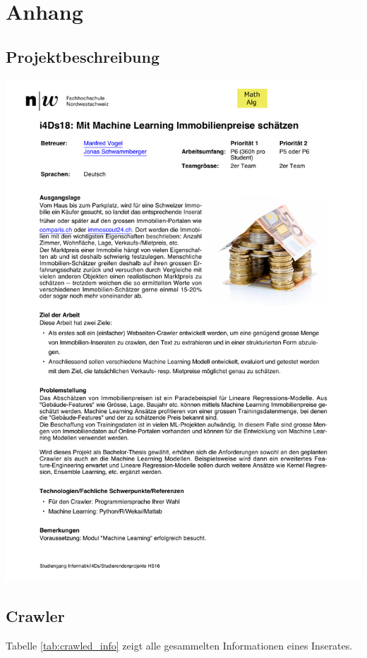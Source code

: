 \section{Anhang}
\subsection{Projektbeschreibung}
\includegraphics[trim={1.5cm 2.3cm 1.5cm 2.5cm},clip,width=\textwidth]{attachments/ausschreibung.pdf}
\newpage
\subsection{Crawler}
\label{crawler_a}
Tabelle \ref{tab:crawled_info} zeigt alle gesammelten Informationen eines Inserates.

